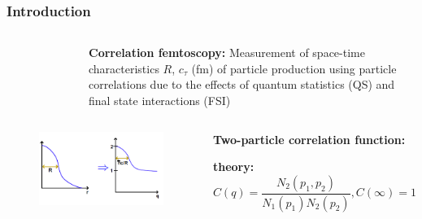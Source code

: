\documentclass[dvipsnames] {beamer}
\begin{document}
\begin{frame}
  \frametitle{Introduction}
  \begin{columns}[c]
    \begin{block}{}
      \begin{figure}[H]
        \includegraphics[width=0.8\linewidth]{corr_femto1.png}
      \end{figure}
    \end{block}
    \begin{block}{{\bf Correlation femtoscopy:}}
      Measurement of space-time characteristics $R$, $c_{\tau}$ (fm) of particle production
      using particle correlations due to the effects of quantum statistics (QS) and final state interactions (FSI)
    \end{block}
  \end{columns}

  \begin{columns}[c]
    \begin{block}{}
      \begin{figure}[H]
        \includegraphics[width=0.8\linewidth]{corr_femto2.png}
      \end{figure}
    \end{block}
    \begin{block}{{\bf \centering Two-particle correlation function:}}
      \tiny{
        \begin{center}
          {\bf theory:     $C(q) = \dfrac{N_{2}(p_{1}, p_{2})}{N_{1}(p_{1}) N_{2}(p_{2})}, C(\infty) = 1$
        
}
\end{center}}
\end{block}
\end{columns}
\end{frame}
\end{document}

